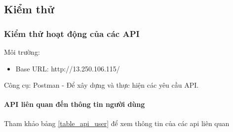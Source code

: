 \subsection{Kiểm thử}

\subsubsection{Kiểm thử hoạt động của các API}


Môi trường: 

\begin{adjustwidth}{1.5em}{}
\begin{itemize}
  \item Base URL: http://13.250.106.115/
\end{itemize}
\end{adjustwidth}

Công cụ: Postman - Để xây dựng và thực hiện các yêu cầu API.



\paragraph{API liên quan đến thông tin người dùng}
\mbox{}

Tham khảo bảng \ref{table_api_user} để xem thông tin của các api liên quan

